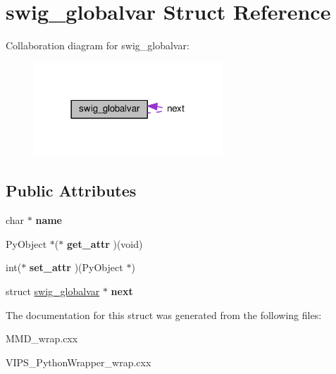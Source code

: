 \hypertarget{structswig__globalvar}{}\section{swig\+\_\+globalvar Struct Reference}
\label{structswig__globalvar}


Collaboration diagram for swig\+\_\+globalvar\+:\nopagebreak
\begin{figure}[H]
\begin{center}
\leavevmode
\includegraphics[width=201pt]{structswig__globalvar__coll__graph}
\end{center}
\end{figure}
\subsection*{Public Attributes}
\begin{DoxyCompactItemize}
\item 
char $\ast$ {\bfseries name}\hypertarget{structswig__globalvar_afbf8fc90fadf3be87612f68d2af889f7}{}\label{structswig__globalvar_afbf8fc90fadf3be87612f68d2af889f7}

\item 
Py\+Object $\ast$($\ast$ {\bfseries get\+\_\+attr} )(void)\hypertarget{structswig__globalvar_a493a5974e1e2509ba48001f1a53d26ae}{}\label{structswig__globalvar_a493a5974e1e2509ba48001f1a53d26ae}

\item 
int($\ast$ {\bfseries set\+\_\+attr} )(Py\+Object $\ast$)\hypertarget{structswig__globalvar_a494e3d5a5f1fb694b7738fdd1ffdd657}{}\label{structswig__globalvar_a494e3d5a5f1fb694b7738fdd1ffdd657}

\item 
struct \hyperlink{structswig__globalvar}{swig\+\_\+globalvar} $\ast$ {\bfseries next}\hypertarget{structswig__globalvar_a9b2b63ce956d35d5270e6460e3a1601e}{}\label{structswig__globalvar_a9b2b63ce956d35d5270e6460e3a1601e}

\end{DoxyCompactItemize}


The documentation for this struct was generated from the following files\+:\begin{DoxyCompactItemize}
\item 
M\+M\+D\+\_\+wrap.\+cxx\item 
V\+I\+P\+S\+\_\+\+Python\+Wrapper\+\_\+wrap.\+cxx\end{DoxyCompactItemize}
